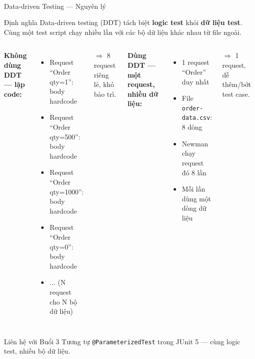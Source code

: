 \documentclass[aspectratio=169,10pt]{beamer}
\newcommand{\sref}[1]{\textsuperscript{\scriptsize\cite{#1}}}
\begin{document}
\begin{frame}{Data-driven Testing --- Nguyên lý\sref{postman-learning}}
  \begin{block}{Định nghĩa}
    Data-driven testing (DDT) tách biệt \textbf{logic test}
    khỏi \textbf{dữ liệu test}. Cùng một test script chạy
    nhiều lần với các bộ dữ liệu khác nhau từ file ngoài.
  \end{block}

  \vspace{0.4em}
  \begin{columns}
    \textbf{Không dùng DDT --- lặp code:}
    \begin{itemize}
      \item Request ``Order qty=1'': body hardcode
      \item Request ``Order qty=500'': body hardcode
      \item Request ``Order qty=1000'': body hardcode
      \item Request ``Order qty=0'': body hardcode
      \item ... (N request cho N bộ dữ liệu)
    \end{itemize}
    $\Rightarrow$ 8 request riêng lẻ, khó bảo trì.

    \textbf{Dùng DDT --- một request, nhiều dữ liệu:}
    \begin{itemize}
      \item 1 request ``Order'' duy nhất
      \item File \texttt{order-data.csv}: 8 dòng
      \item Newman chạy request đó 8 lần
      \item Mỗi lần dùng một dòng dữ liệu
    \end{itemize}
    $\Rightarrow$ 1 request, dễ thêm/bớt test case.

  \end{columns}

  \vspace{0.3em}
  \begin{exampleblock}{Liên hệ với Buổi 3}
    Tương tự \texttt{@ParameterizedTest} trong JUnit 5 ---
    cùng logic test, nhiều bộ dữ liệu.
  \end{exampleblock}
\end{frame}
\end{document}

